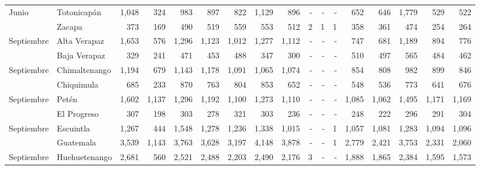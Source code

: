 \begin{landscape}
\begin{center}
\begin{longtable}{llrrrrrrrrrrrrrrr}
\multicolumn{1}{l}{	\footnotesize	 Junio 	}&	 Totonicapán 	&	 1,048 	&	 324 	&	 983 	&	 897 	&	 822 	&	 1,129 	&	 896 	&	 -   	&	 -   	&	 -   	&	 652 	&	 646 	&	 1,779 	&	 529 	&	 522 	\\
\rowcolor{color1!5!white}\multicolumn{1}{l}{	\footnotesize	 Junio 	}&	 Zacapa 	&	 373 	&	 169 	&	 490 	&	 519 	&	 559 	&	 553 	&	 512 	&	 2 	&	 1 	&	 1 	&	 358 	&	 361 	&	 474 	&	 254 	&	 264 	\\
\multicolumn{1}{l}{	\footnotesize	 Septiembre 	}&	 Alta Verapaz 	&	 1,653 	&	 576 	&	 1,296 	&	 1,123 	&	 1,012 	&	 1,277 	&	 1,112 	&	 -   	&	 -   	&	 -   	&	 747 	&	 681 	&	 1,189 	&	 894 	&	 776 	\\
\rowcolor{color1!5!white}\multicolumn{1}{l}{	\footnotesize	 Septiembre 	}&	 Baja Verapaz 	&	 329 	&	 241 	&	 471 	&	 453 	&	 488 	&	 347 	&	 300 	&	 -   	&	 -   	&	 -   	&	 510 	&	 497 	&	 565 	&	 484 	&	 462 	\\
\multicolumn{1}{l}{	\footnotesize	 Septiembre 	}&	 Chimaltenango 	&	 1,194 	&	 679 	&	 1,143 	&	 1,178 	&	 1,091 	&	 1,065 	&	 1,074 	&	 -   	&	 -   	&	 -   	&	 854 	&	 808 	&	 982 	&	 899 	&	 846 	\\
\rowcolor{color1!5!white}\multicolumn{1}{l}{	\footnotesize	 Septiembre 	}&	 Chiquimula 	&	 685 	&	 233 	&	 870 	&	 763 	&	 804 	&	 853 	&	 652 	&	 -   	&	 -   	&	 -   	&	 548 	&	 536 	&	 773 	&	 641 	&	 676 	\\
\multicolumn{1}{l}{	\footnotesize	 Septiembre 	}&	 Petén 	&	 1,602 	&	 1,137 	&	 1,296 	&	 1,192 	&	 1,100 	&	 1,273 	&	 1,110 	&	 -   	&	 -   	&	 -   	&	 1,085 	&	 1,062 	&	 1,495 	&	 1,171 	&	 1,169 	\\
\rowcolor{color1!5!white}\multicolumn{1}{l}{	\footnotesize	 Septiembre 	}&	 El Progreso 	&	 307 	&	 198 	&	 303 	&	 278 	&	 321 	&	 303 	&	 236 	&	 -   	&	 -   	&	 -   	&	 248 	&	 222 	&	 296 	&	 291 	&	 304 	\\
\multicolumn{1}{l}{	\footnotesize	 Septiembre 	}&	 Escuintla 	&	 1,267 	&	 444 	&	 1,548 	&	 1,278 	&	 1,236 	&	 1,338 	&	 1,015 	&	 -   	&	 -   	&	 1 	&	 1,057 	&	 1,081 	&	 1,283 	&	 1,094 	&	 1,096 	\\
\rowcolor{color1!5!white}\multicolumn{1}{l}{	\footnotesize	 Septiembre 	}&	 Guatemala 	&	 3,539 	&	 1,143 	&	 3,763 	&	 3,628 	&	 3,197 	&	 4,148 	&	 3,878 	&	 -   	&	 -   	&	 1 	&	 2,779 	&	 2,421 	&	 3,753 	&	 2,331 	&	 2,060 	\\
\multicolumn{1}{l}{	\footnotesize	 Septiembre 	}&	 Huehuetenango 	&	 2,681 	&	 560 	&	 2,521 	&	 2,488 	&	 2,203 	&	 2,490 	&	 2,176 	&	 3 	&	 -   	&	 -   	&	 1,888 	&	 1,865 	&	 2,384 	&	 1,595 	&	 1,573 	\\

\end{longtable}
\end{center}
\end{landscape}
